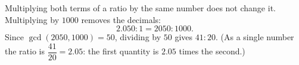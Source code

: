 Multiplying both terms of a ratio by the same number does not change it. Multiplying by $1000$ removes the decimals:
\[2.050:1=2050:1000.\]
Since $\gcd(2050,1000)=50$, dividing by $50$ gives $\boxed{41:20}$. (As a single number the ratio is $\dfrac{41}{20}=2.05$: the first quantity is $2.05$ times the second.)
